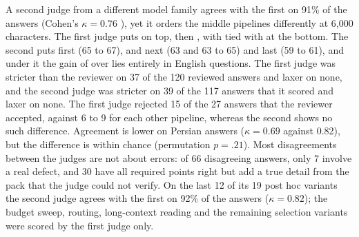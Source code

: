 A second judge from a different model family agrees with the first on 91\% of the answers (Cohen's $\kappa=0.76$ \citep{cohen1960kappa}), yet it orders the middle pipelines differently at 6,000 characters. The first judge puts \hr{} on top, then \lexb{}, with \setr{} tied with \hybrid{} at the bottom. The second puts \lexb{} first (65 to 67), \hr{} and \setr{} next (63 and 63 to 65) and \hybrid{} last (59 to 61), and under it the gain of \lexb{} over \hybrid{} lies entirely in English questions. %
The first judge was stricter than the reviewer on 37 of the 120 reviewed answers and laxer on none, and the second judge was stricter on 39 of the 117 answers that it scored and laxer on none. The first judge rejected 15 of the 27 \setr{} answers that the reviewer accepted, against 6 to 9 for each other pipeline, whereas the second shows no such difference. Agreement is lower on Persian answers ($\kappa=0.69$ against 0.82), but the difference is within chance (permutation $p=.21$). Most disagreements between the judges are not about errors: of 66 disagreeing answers, only 7 involve a real defect, and 30 have all required points right but add a true detail from the pack that the judge could not verify. On the last 12 of its 19 post hoc variants the second judge agrees with the first on 92\% of the answers ($\kappa=0.82$); the budget sweep, routing, long-context reading and the remaining selection variants were scored by the first judge only. %

